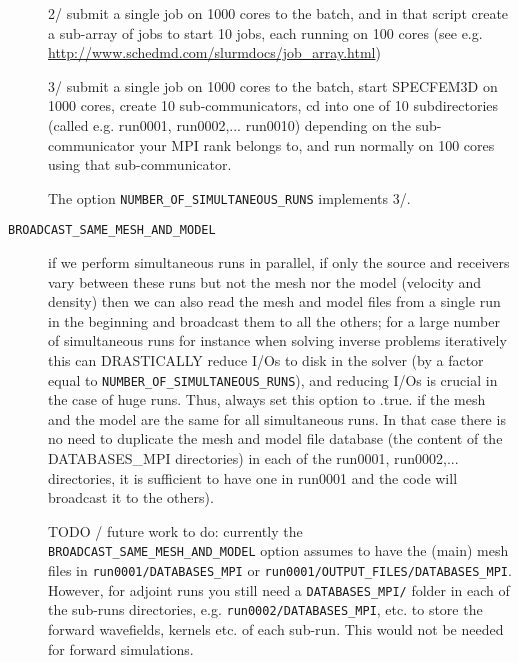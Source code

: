 \begin{description}
2/ submit a single job on 1000 cores to the batch, and in that script create a sub-array of jobs to start 10 jobs,
each running on 100 cores (see e.g. \url{http://www.schedmd.com/slurmdocs/job_array.html})\newline

3/ submit a single job on 1000 cores to the batch, start SPECFEM3D on 1000 cores, create 10 sub-communicators,
cd into one of 10 subdirectories (called e.g. run0001, run0002,... run0010) depending on the sub-communicator
your MPI rank belongs to, and run normally on 100 cores using that sub-communicator.\newline

The option \texttt{NUMBER\_OF\_SIMULTANEOUS\_RUNS} implements 3/.\newline

\item [{\texttt{BROADCAST\_SAME\_MESH\_AND\_MODEL}}] if we perform simultaneous runs in parallel,
if only the source and receivers vary between these runs
but not the mesh nor the model (velocity and density) then we can also read the mesh and model files
from a single run in the beginning and broadcast them to all the others; for a large number of simultaneous
runs for instance when solving inverse problems iteratively this can DRASTICALLY reduce I/Os to disk in the solver
(by a factor equal to \texttt{NUMBER\_OF\_SIMULTANEOUS\_RUNS}), and reducing I/Os is crucial in the case of huge runs.
Thus, always set this option to .true. if the mesh and the model are the same for all simultaneous runs.
In that case there is no need to duplicate the mesh and model file database (the content of the DATABASES\_MPI
directories) in each of the run0001, run0002,... directories, it is sufficient to have one in run0001
and the code will broadcast it to the others).\newline


TODO / future work to do: currently the \texttt{BROADCAST\_SAME\_MESH\_AND\_MODEL}
option assumes to have the (main) mesh files in \texttt{run0001/DATABASES\_MPI} or
\texttt{run0001/OUTPUT\_FILES/DATABASES\_MPI}.
However, for adjoint runs you still need a \texttt{DATABASES\_MPI/} folder in each of the sub-runs directories,
e.g. \texttt{run0002/DATABASES\_MPI}, etc. to store the forward wavefields, kernels etc. of each sub-run.
This would not be needed for forward simulations.\newline


\end{description}
